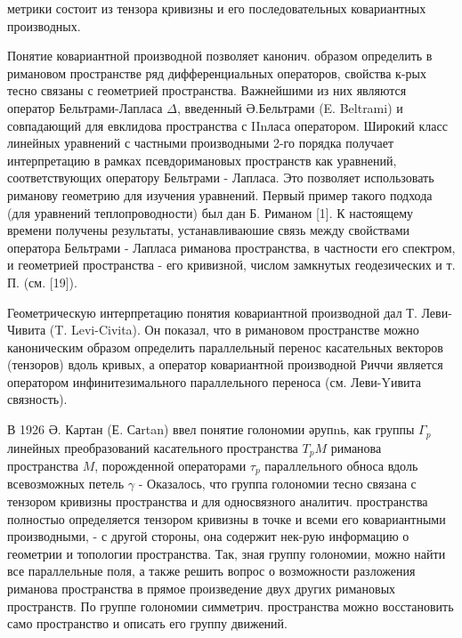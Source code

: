\documentclass[10pt]{article}
\begin{document}
метрики состоит из тензора кривизны и его последовательных ковариантных производных.



Понятие ковариантной производной позволяет канонич. образом определить в римановом пространстве ряд дифференциальных операторов, свойства к-рых тесно связаны с геометрией пространства. Важнейшими из них являются оператор Бельтрами-Лапласа $\Delta$, введенный Ә.Бельтрами (E. Beltrami) и совпадающий для евклидова пространства с IInласа оператором. Широкий класс линейных уравнений с частными производными 2-го порядка получает интерпретацию в рамках псевдоримановых пространств как уравнений, соответствующих оператору Бельтрами - Лапласа. Это позволяет использовать риманову геометрию для изучения уравнений. Первый пример такого подхода (для уравнений теплопроводности) был дан Б. Риманом [1]. К настоящему времени получены результаты, устанавливаюшие связь между свойствами оператора Бельтрами - Лапласа риманова пространства, в частности его спектром, и геометрией пространства - его кривизной, числом замкнутых геодезических и т. П. (см. [19]).



Геометрическую интерпретацию понятия ковариантной производной дал Т. Леви-Чивита (T. Levi-Civita). Он показал, что в римановом пространстве можно каноническим образом определить параллельный перенос касательных векторов (тензоров) вдоль кривых, а оператор ковариантной производной Риччи является оператором инфинитезимального параллельного переноса (см. Леви-Yивита связность).



В 1926 Ә. Картан (Е. Саrtan) ввел понятие голономии әрупnь, как группы $\Gamma_{p}$ линейных преобразований касательного пространства $T_{p} M$ риманова пространства $M$, порожденной операторами $\tau_{p}$ параллельного обноса вдоль всевозможных петель $\gamma$ - Оказалось, что группа голономии тесно связана с тензором кривизны пространства и для односвязного аналитич. пространства полностыо определяется тензором кривизны в точке и всеми его ковариантными производными, - с другой стороны, она содержит нек-рую информацию о геометрии и топологии пространства. Так, зная группу голономии, можно найти все параллельные поля, а также решить вопрос о возможности разложения риманова пространства в прямое произведение двух других римановых пространств. По группе голономии симметрич. пространства можно восстановить само пространство и описать его группу движений.
\end{document}
